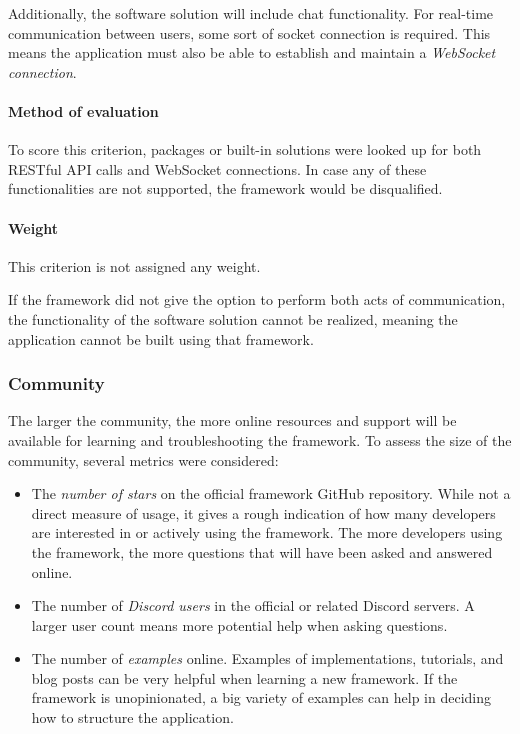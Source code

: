 Additionally, the software solution will include chat functionality.
For real-time communication between users, some sort of socket connection is required.
This means the application must also be able to establish and maintain a \emph{WebSocket connection}.

\paragraph{Method of evaluation}
To score this criterion, packages or built-in solutions were looked up for both RESTful API calls and WebSocket connections.
In case any of these functionalities are not supported, the framework would be disqualified.

\paragraph{Weight}
This criterion is not assigned any weight.

If the framework did not give the option to perform both acts of communication, the functionality of the software solution cannot be realized, meaning the application cannot be built using that framework.

\subsubsection{Community}\label{subsubsec:community}
The larger the community, the more online resources and support will be available for learning and troubleshooting the framework.
To assess the size of the community, several metrics were considered:

\begin{itemize}
	\item The \emph{number of stars} on the official framework GitHub repository.
	      While not a direct measure of usage, it gives a rough indication of how many developers are interested in or actively using the framework.
	      The more developers using the framework, the more questions that will have been asked and answered online.
	\item The number of \emph{Discord users} in the official or related Discord servers.
	      A larger user count means more potential help when asking questions.
	\item The number of \emph{examples} online.
	      Examples of implementations, tutorials, and blog posts can be very helpful when learning a new framework.
	      If the framework is unopinionated, a big variety of examples can help in deciding how to structure the application.
\end{itemize}

